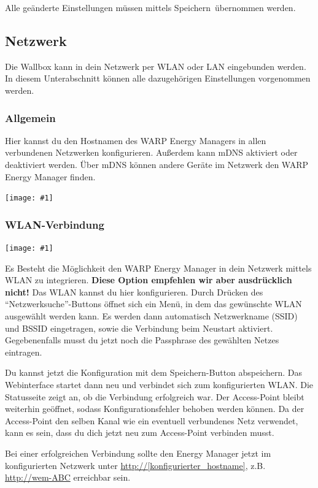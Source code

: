 \documentclass[a4paper,10pt]{article}
\newcommand{\gfx}[1]{\texttt{[image: \#1]}}
\begin{document}
\begin{multicols*}{2}
	Alle geänderte Einstellungen müssen mittels \glqq Speichern\grqq~übernommen 
	werden.

	\newpage
	\subsection{Netzwerk}
	\label{network}
	Die Wallbox kann in dein Netzwerk per WLAN oder LAN eingebunden werden.
	In diesem Unterabschnitt können alle dazugehörigen Einstellungen vorgenommen werden.

	\subsubsection{Allgemein}
	Hier kannst du den Hostnamen des WARP Energy Managers in allen verbundenen Netzwerken konfigurieren. Außerdem kann mDNS aktiviert oder deaktiviert werden.
	Über mDNS können andere Geräte im Netzwerk den WARP Energy Manager finden.

	\gfx{./img/resized/web_network}


	\subsubsection{WLAN-Verbindung}
	\gfx{./img/resized/web_wifi_sta}

	Es Besteht die Möglichkeit den WARP Energy Manager in dein Netzwerk mittels
	WLAN zu integrieren. \textbf{Diese Option empfehlen wir aber ausdrücklich
	nicht!} Das WLAN kannst du hier konfigurieren.
	Durch Drücken des \enquote{Netzwerksuche}-Buttons öffnet sich ein Menü, in dem das gewünschte WLAN ausgewählt werden kann.
	Es werden dann automatisch Netzwerkname (SSID) und BSSID eingetragen, sowie die Verbindung beim Neustart aktiviert.
	Gegebenenfalls musst du jetzt noch die Passphrase des gewählten Netzes eintragen.

	Du kannst jetzt die Konfiguration mit dem Speichern-Button abspeichern.
	Das Webinterface startet dann neu und verbindet sich zum konfigurierten WLAN. Die Statusseite zeigt
	an, ob die Verbindung erfolgreich war. Der Access-Point bleibt weiterhin
	geöffnet, sodass Konfigurationsfehler behoben werden können.
	Da der Access-Point den selben Kanal wie ein eventuell verbundenes Netz verwendet,
	kann es sein, dass du dich jetzt neu zum Access-Point verbinden musst.

	Bei einer erfolgreichen Verbindung sollte den Energy Manager jetzt im konfigurierten Netzwerk unter
	\url{http://[konfigurierter_hostname]}, z.B. \url{http://wem-ABC} erreichbar sein.


\end{multicols*}
\end{document}
